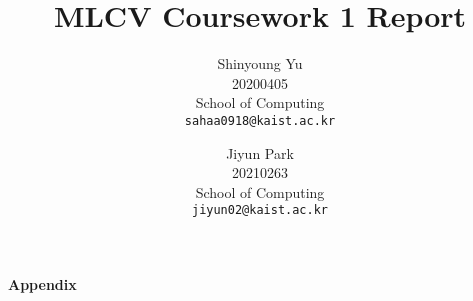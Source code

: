\documentclass[10pt,twocolumn,letterpaper]{article}
\begin{document}
\title{MLCV Coursework 1 Report}

\author{Shinyoung Yu\\
20200405\\
School of Computing\\
{\tt\small sahaa0918@kaist.ac.kr}
\and
Jiyun Park\\
20210263\\
School of Computing\\
{\tt\small jiyun02@kaist.ac.kr}
}

\maketitle

%    






\onecolumn
\newpage
{\LARGE 
	\textbf{Appendix}\par}
\appendix


% 
\end{document}
